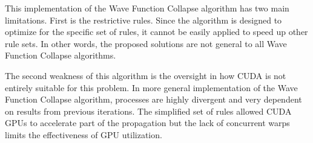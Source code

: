 
This implementation of the Wave Function Collapse algorithm has two main limitations. First is the restrictive rules. Since the algorithm is designed to optimize for the specific set of rules, it cannot be easily applied to speed up other rule sets. In other words, the proposed solutions are not general to all Wave Function Collapse algorithms. 

The second weakness of this algorithm is the oversight in how CUDA is not entirely suitable for this problem. In more general implementation of the Wave Function Collapse algorithm, processes are highly divergent and very dependent on results from previous iterations. The simplified set of rules allowed CUDA GPUs to accelerate part of the propagation but the lack of concurrent warps limits the effectiveness of GPU utilization.